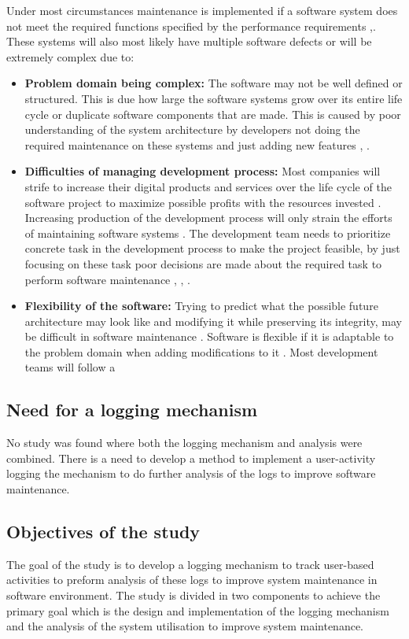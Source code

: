 Under most circumstances maintenance is implemented if a software system does not meet the required functions specified by the performance requirements \cite{Ogheneovo2014},\cite{Sneed2004}. These systems will also most likely have multiple software defects or will be extremely complex due to:
\begin{itemize}
    \item \textbf{Problem domain being complex:} The software may not be well defined or structured. This is due how large the software systems grow over its entire life cycle or duplicate software components that are made. This is caused by poor understanding of the system architecture by developers not doing the required maintenance on these systems and just adding new features \cite{Galster2019}, \cite{Booch1986}.
    \item \textbf{Difficulties of managing development process:} Most companies will strife to increase their digital products and services over the life cycle of the software project to maximize possible profits with the resources invested \cite{Niu2018}. Increasing production of the development process will only strain the efforts of maintaining software systems \cite{Sneed2004}. The development team needs to prioritize concrete task in the development process to make the project feasible, by just focusing on these task poor decisions are made about the required task to perform software maintenance \cite{Galster2019}, \cite{Ogheneovo2014}, \cite{Lenarduzzi2017}. 
    \item \textbf{Flexibility of the software:} Trying to predict what the possible future architecture may look like and modifying it while preserving its integrity, may be difficult in software maintenance \cite{Garlan1999}. Software is flexible if it is adaptable to the problem domain when adding modifications to it \cite{Ogheneovo2014}. Most development teams will follow a 
\end{itemize}
\newpage

\subsection{Need for a logging mechanism}
No study was found where both the logging mechanism and analysis were combined.
There is a need to develop a method to implement a user-activity logging
the mechanism to do further analysis of the logs to improve software
maintenance.

\subsection{Objectives of the study}
The goal of the study is to develop a logging mechanism to track user-based
activities to preform analysis of these logs to improve system maintenance in
software environment. The study is divided in two components to achieve the
primary goal which is the design and implementation of the logging mechanism
and the analysis of the system utilisation to improve system maintenance.

